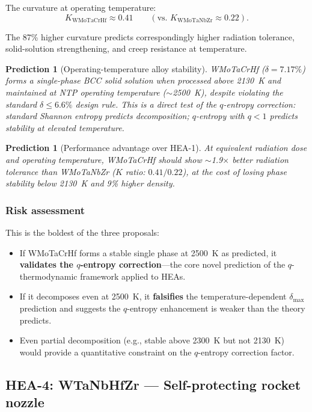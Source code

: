\documentclass[12pt,letterpaper]{article}
\newtheorem{prediction}[theorem]{Prediction}
\theoremstyle{definition}
\begin{document}
The curvature at operating temperature:
\begin{equation}
  K_{\mathrm{WMoTaCrHf}} \approx 0.41 \qquad (\text{vs.\ } K_{\mathrm{WMoTaNbZr}} \approx 0.22).
\end{equation}

The 87\% higher curvature predicts correspondingly higher radiation tolerance, solid-solution strengthening, and creep resistance at temperature.

\begin{prediction}[Operating-temperature alloy stability]
WMoTaCrHf ($\delta = 7.17\%$) forms a single-phase BCC solid solution when processed above 2130~K and maintained at NTP operating temperature ($\sim$2500~K), despite violating the standard $\delta \leq 6.6\%$ design rule.  This is a direct test of the $q$-entropy correction: standard Shannon entropy predicts decomposition; $q$-entropy with $q < 1$ predicts stability at elevated temperature.
\end{prediction}

\begin{prediction}[Performance advantage over HEA-1]
At equivalent radiation dose and operating temperature, WMoTaCrHf should show $\sim$1.9$\times$ better radiation tolerance than WMoTaNbZr ($K$ ratio: $0.41/0.22$), at the cost of losing phase stability below 2130~K and 9\% higher density.
\end{prediction}

\subsubsection{Risk assessment}

This is the boldest of the three proposals:
\begin{itemize}
  \item If WMoTaCrHf forms a stable single phase at 2500~K as predicted, it \textbf{validates the $q$-entropy correction}---the core novel prediction of the $q$-thermodynamic framework applied to HEAs.
  \item If it decomposes even at 2500~K, it \textbf{falsifies} the temperature-dependent $\delta_{\max}$ prediction and suggests the $q$-entropy enhancement is weaker than the theory predicts.
  \item Even partial decomposition (e.g., stable above 2300~K but not 2130~K) would provide a quantitative constraint on the $q$-entropy correction factor.
\end{itemize}

\subsection{HEA-4: WTaNbHfZr --- Self-protecting rocket nozzle}
\end{document}
